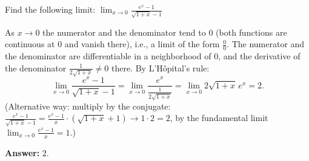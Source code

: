 
\begin{question}
Find the following limit:
$\displaystyle \lim_{x\to 0}\frac{e^x-1}{\sqrt{1+x}-1}$
\end{question}

\begin{solution}
As $x\to0$ the numerator and the denominator tend to $0$ (both functions are continuous at $0$ and vanish there), i.e., a limit of the form $\frac00$. The numerator and the denominator are differentiable in a neighborhood of $0$, and the derivative of the denominator $\frac{1}{2\sqrt{1+x}}\neq0$ there. By L'Hôpital's rule:
\[
\lim_{x\to0}\frac{e^x-1}{\sqrt{1+x}-1}=\lim_{x\to0}\frac{e^x}{\frac{1}{2\sqrt{1+x}}}=\lim_{x\to0}2\sqrt{1+x}\,e^x=2.
\]
(Alternative way: multiply by the conjugate: $\frac{e^x-1}{\sqrt{1+x}-1}=\frac{e^x-1}{x}\cdot(\sqrt{1+x}+1)\to 1\cdot2=2$, by the fundamental limit $\lim_{x\to0}\frac{e^x-1}{x}=1$.)

\textbf{Answer:} $2$.
\end{solution}

